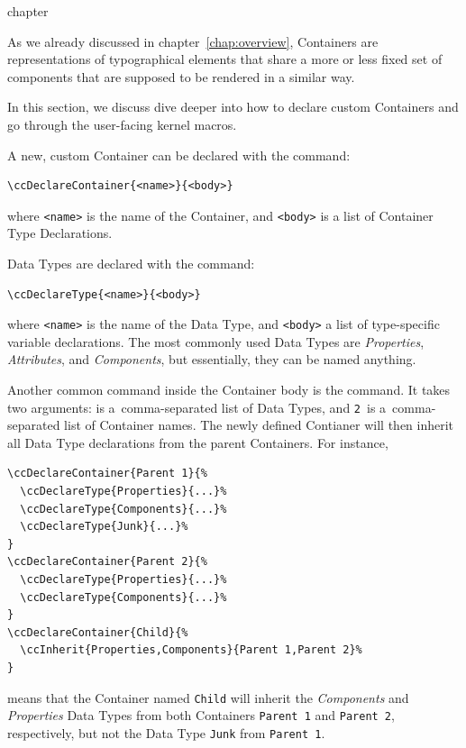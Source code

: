 \begin{Heading}{chapter}
\end{Heading}


As we already discussed in chapter~\ref{chap:overview},
Containers are representations of typographical
elements that share a more or less fixed set of components that are
supposed to be rendered in a similar way.

In this section, we discuss dive deeper into how to declare custom
Containers and go through the user-facing {\CoCoTeX} kernel macros.

A new, custom Container can be declared with the
\DeclareMacro{\ccDeclareContainer} command:
\begin{lstlisting}
\ccDeclareContainer{<name>}{<body>}
\end{lstlisting}
where \lstinline{<name>} is the name of the Container, and
\lstinline{<body>} is a list of Container Type Declarations.

Data Types are declared with the \DeclareMacro{\ccDeclareType} command:
\begin{lstlisting}
\ccDeclareType{<name>}{<body>}
\end{lstlisting}
where \lstinline{<name>} is the name of the Data Type, and
\lstinline{<body>} a list of type-specific variable declarations. The
most commonly used Data Types are \textit{Properties},
\textit{Attributes}, and \textit{Components}, but essentially, they
can be named anything.

Another common command inside the Container body is the
\DeclareMacro{\ccInherit} command. It takes two arguments:
 is a~comma-separated list of Data Types, and
\lstinline{2}~is a~comma-separated list of Container names. The newly
defined Contianer will then inherit all Data Type declarations from
the parent Containers. For instance,
\begin{lstlisting}
\ccDeclareContainer{Parent 1}{%
  \ccDeclareType{Properties}{...}%
  \ccDeclareType{Components}{...}%
  \ccDeclareType{Junk}{...}%
}
\ccDeclareContainer{Parent 2}{%
  \ccDeclareType{Properties}{...}%
  \ccDeclareType{Components}{...}%
}
\ccDeclareContainer{Child}{%
  \ccInherit{Properties,Components}{Parent 1,Parent 2}%
}
\end{lstlisting}
means that the Container named \lstinline{Child} will inherit the
\textit{Components} and \textit{Properties} Data Types from both
Containers \lstinline{Parent 1} and \lstinline{Parent 2},
respectively, but not the Data Type \lstinline{Junk} from \lstinline{Parent 1}.

